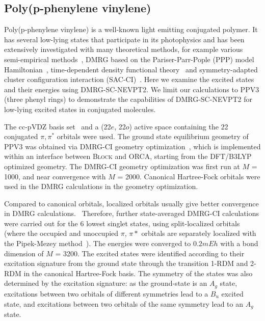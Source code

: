 \subsection{Poly(p-phenylene vinylene)}

Poly(p-phenylene vinylene) is a well-known light emitting conjugated polymer. It has several low-lying states that participate in its photophysics 
and has been extensively investigated with many theoretical methods, for example various semi-empirical methods~\cite{beljonne_theoretical_1995}, DMRG based on the Pariser-Parr-Pople (PPP) model Hamiltonian~\cite{lavrentiev_theoretical_1999, shukla_correlated_2002,bursill_symmetry-adapted_2009}, time-dependent density functional theory~\cite{han_time-dependent_2004} and symmetry-adapted cluster configuration interaction (SAC-CI)~\cite{saha_investigation_2007}. 
Here we examine the excited states and their energies using DMRG-SC-NEVPT2.
We limit our calculations to PPV3 (three phenyl rings) to demonstrate the capabilities of DMRG-SC-NEVPT2 for low-lying excited states in conjugated molecules.

The cc-pVDZ basis set~\cite{dunning1989gaussian} and a (22$e$, 22$o$) active space containing the 22 conjugated $\pi, \pi^*$ orbitals were used. The ground state equilibrium geometry of PPV3 was obtained via DMRG-CI geometry optimization~\cite{hu_excited-state_2015}, which is implemented within an interface between \textsc{Block} and \textsc{ORCA}\cite{neese_orca_2012}, starting from the DFT/B3LYP optimized geometry. The DMRG-CI geometry optimization was first run at $M$ = 1000, and near convergence with $M$ = 2000. Canonical Hartree-Fock orbitals were used 
in the DMRG calculations in the geometry optimization.

Compared to canonical orbitals, localized orbitals usually give better convergence in DMRG calculations.~\cite{olivares-amaya_ab-initio_2015} Therefore, further state-averaged DMRG-CI calculations were carried out for the 6 lowest singlet states, using split-localized orbitals (where the occupied and unoccupied $\pi$, $\pi*$ orbitals are separately localized with the Pipek-Mezey method~\cite{pipek_fast_1989}). The energies were converged to $0.2mEh$ with a bond dimension of $M$ = 3200. The excited states were identified according to their excitation signature from the ground state through the transition 1-RDM and 2-RDM
in the canonical Hartree-Fock basis. The symmetry of the states was also determined by the excitation signature: as the ground-state
 is an $A_g$ state, excitations between two orbitals of different symmetries lead to a $B_u$ excited state, and excitations between two orbitals of the same symmetry lead to an $A_g$ state.


